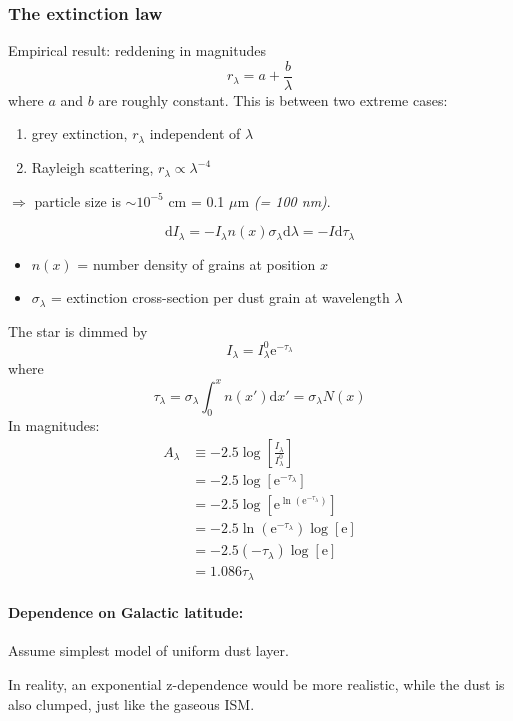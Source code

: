 \documentclass[12pt]{article}
\newcommand{\mar}[1]{\hspace{0pt}\marginpar{-\textcolor{black}{#1}-}}
\newcommand{\mynotes}[1]{{\fontfamily{cmss}\selectfont \textit{#1}}}
\begin{document}
\newpage
\subsubsection{The extinction law}
\mar{117}Empirical result: reddening in magnitudes
\[
    r_{\lambda} = a + \frac{b}{\lambda}
    \]
where $a$ and $b$ are roughly constant. This is between two extreme cases:
\begin{enumerate}
    \item grey extinction, $r_{\lambda}$ independent of $\lambda$
    \item Rayleigh scattering, $r_{\lambda} \propto \lambda^{-4}$
\end{enumerate}
$\Rightarrow$ particle size is $\sim 10^{-5}$ cm = 0.1 $\mu$m
\mynotes{(= 100 nm)}.

\[
    \mathrm{d}I_{\lambda}
    = -I_{\lambda}n(x)\sigma_{\lambda}\mathrm{d}\lambda
    = -I\mathrm{d}\tau_{\lambda}
    \]
\begin{itemize}
    \item $n(x)$ = number density of grains at position $x$
    \item $\sigma_{\lambda}$ = extinction cross-section per dust grain at
        wavelength $\lambda$
\end{itemize}
The star is dimmed by
\[
    I_{\lambda} = I_{\lambda} ^{0}\mathrm{e}^{-\tau_{\lambda} }
    \]
where
\[
    \tau_{\lambda}  = \sigma_{\lambda} \int_{0}^{x} {n(x')\mathrm{d}x'
    =\sigma_{\lambda}N(x) }
    \]
In magnitudes:
\begin{align*}
    A_{\lambda}
    &\equiv -2.5\log\left[ \frac{I_{\lambda} }{I_{\lambda}^{0}} \right]\\
    &= -2.5\log\left[ \mathrm{e}^{-\tau_{\lambda}} \right]\\
    &= -2.5\log\left[\mathrm{e}^{\ln(\mathrm{e}^{-\tau_{\lambda}}) }\right]\\
    &= -2.5\ln(\mathrm{e}^{-\tau_{\lambda}}) \log\left[\mathrm{e} \right]\\
    &= -2.5 (-\tau_{\lambda}) \log\left[\mathrm{e} \right]\\
    &= 1.086\tau_{\lambda}
\end{align*}

\paragraph{Dependence on Galactic latitude:}
Assume simplest model of uniform dust layer.

\mar{118}In reality, an exponential z-dependence would be more realistic,
while the dust is also clumped, just like the gaseous ISM.
\end{document}
